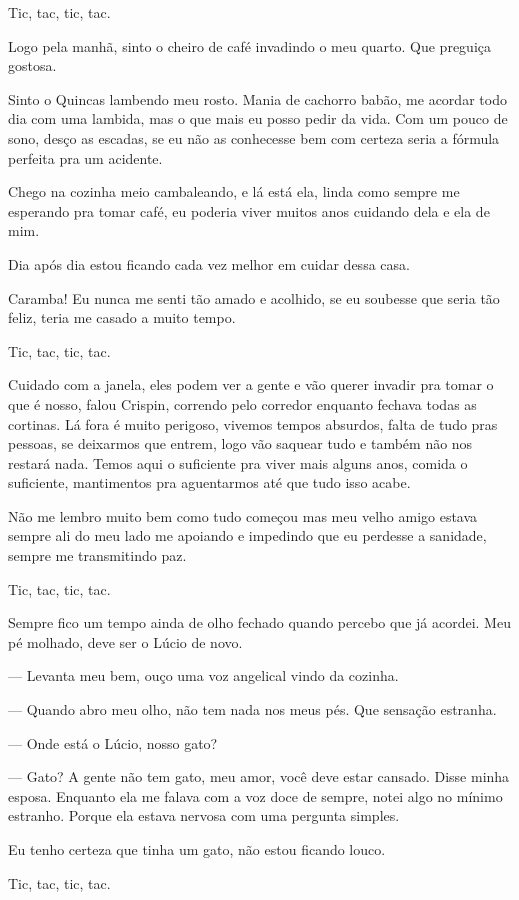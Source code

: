 Tic, tac, tic, tac.

Logo pela manhã, sinto o cheiro de café invadindo o meu quarto. Que preguiça gostosa.

Sinto o Quincas lambendo meu rosto. Mania de cachorro babão, me acordar todo dia com uma lambida, mas o que mais eu posso pedir da vida. Com um pouco de sono, desço as escadas, se eu não as conhecesse bem com certeza seria a fórmula perfeita pra um acidente.

Chego na cozinha meio cambaleando, e lá está ela, linda como sempre me esperando pra tomar café, eu poderia viver muitos anos cuidando dela e ela de mim.

Dia após dia estou ficando cada vez melhor em cuidar dessa casa.

Caramba! Eu nunca me senti tão amado e acolhido, se eu soubesse que seria tão feliz, teria me casado a muito tempo.

Tic, tac, tic, tac.

Cuidado com a janela, eles podem ver a gente e vão querer invadir pra tomar o que é nosso, falou Crispin, correndo pelo corredor enquanto fechava todas as cortinas.
Lá fora é muito perigoso, vivemos tempos absurdos, falta de tudo pras pessoas, se deixarmos que entrem, logo vão saquear tudo e também não nos restará nada.
Temos aqui o suficiente pra viver mais alguns anos, comida o suficiente, mantimentos pra aguentarmos até que tudo isso acabe.

Não me lembro muito bem como tudo começou mas meu velho amigo estava sempre ali do meu lado me apoiando e impedindo que eu perdesse a sanidade, sempre me transmitindo paz.

Tic, tac, tic, tac.

Sempre fico um tempo ainda de olho fechado quando percebo que já acordei. Meu pé molhado, deve ser o Lúcio de novo.

— Levanta meu bem, ouço uma voz angelical vindo da cozinha.

— Quando abro meu olho, não tem nada nos meus pés. Que sensação estranha.

— Onde está o Lúcio, nosso gato?

— Gato? A gente não tem gato, meu amor, você deve estar cansado. Disse minha esposa. Enquanto ela me falava com a voz doce de sempre, notei algo no mínimo estranho. Porque ela estava nervosa com uma pergunta simples.

Eu tenho certeza que tinha um gato, não estou ficando louco.

Tic, tac, tic, tac.

